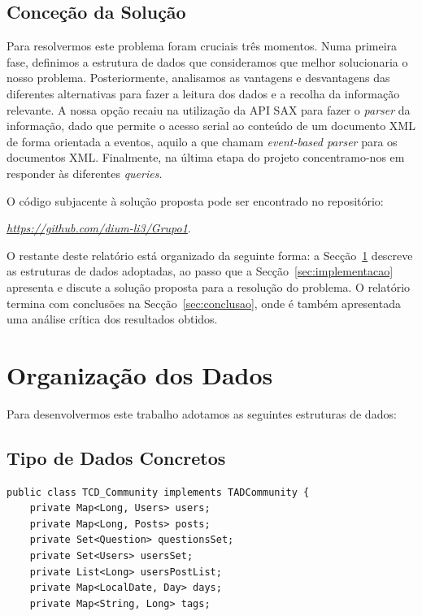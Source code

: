 \documentclass[a4paper]{article}
\begin{document}
\subsection{Conceção da Solução}
\label{sec:solucao}

Para resolvermos este problema foram cruciais três momentos. Numa primeira fase,
definimos a estrutura de dados que consideramos que melhor solucionaria o nosso
problema. Posteriormente, analisamos as vantagens e desvantagens das diferentes
alternativas para fazer a leitura dos dados e a recolha da informação relevante.
A nossa opção recaiu na utilização da API SAX para fazer o \textit{parser} da
informação, dado que permite o acesso serial ao conteúdo de um documento XML de
forma orientada a eventos, aquilo a que chamam \textit{event-based parser} para
os documentos XML.
Finalmente, na última etapa do projeto concentramo-nos em responder
às diferentes \textit{queries}.

O código subjacente à solução proposta pode ser encontrado no repositório:

\begin{center}
\href{https://github.com/dium-li3/Grupo1}{\emph{https://github.com/dium-li3/Grupo1}}.
\end{center}

O restante deste relatório está organizado da seguinte forma: a
Secção~\ref{sec:estruturadedados} descreve as estruturas de dados adoptadas,
ao passo que a Secção~\ref{sec:implementacao}  apresenta e discute a solução
proposta para a resolução do problema. O relatório termina com conclusões na
Secção~\ref{sec:conclusao}, onde é também apresentada uma análise crítica dos
resultados obtidos.



\section{Organização dos Dados}
\label{sec:estruturadedados}

Para desenvolvermos este trabalho adotamos as seguintes estruturas de dados:

\subsection{Tipo de Dados Concretos}
\label{sec:dados_concretos}

\begin{verbatim}
public class TCD_Community implements TADCommunity {
    private Map<Long, Users> users;
    private Map<Long, Posts> posts;
    private Set<Question> questionsSet;
    private Set<Users> usersSet;
    private List<Long> usersPostList;
    private Map<LocalDate, Day> days;
    private Map<String, Long> tags;
\end{verbatim}
\end{document}
